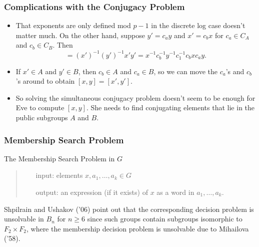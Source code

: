 \documentclass{beamer}
\begin{document}
\begin{frame}
	\frametitle{Complications with the Conjugacy Problem}
	\begin{itemize}
		\item That exponents are only defined mod $p-1$ in the discrete log case doesn't matter much. On the other hand, suppose $y' = c_ay$ and $x' = c_bx$ for $c_a\in C_A$ and $c_b\in C_B$. Then\pause
		\begin{equation*}
			[x',y'] = (x')^{-1}(y')^{-1}x'y' = x^{-1}c_b^{-1}y^{-1}c_1^{-1}c_bxc_ay.
		\end{equation*}\pause
		\item If $x'\in A$ and $y'\in B$, then $c_b\in A$ and $c_a\in B$, so we can move the $c_a$'s and $c_b$'s around to obtain $[x,y] = [x', y']$.\pause
		\item So solving the simultaneous conjugacy problem doesn't seem to be enough for Eve to compute $[x,y]$. She needs to find conjugating elements that lie in the public subgroups $A$ and $B$.
	\end{itemize}
\end{frame}

\begin{frame}
	\frametitle{Membership Search Problem}
	\begin{block}{The Membership Search Problem in $G$}
		\begin{quote}
			\begin{itemize}
				\item[input: ]elements $x, a_1, \ldots, a_k\in G$
				\item[output: ]an expression (if it exists) of $x$ as a word in $a_1, \ldots, a_k$.
			\end{itemize}
		\end{quote}
	\end{block}\pause
	Shpilrain and Ushakov ('06) point out that the corresponding decision problem is unsolvable in $B_n$ for $n\geq 6$ since such groups contain subgroups isomorphic to $F_2\times F_2$, where the membership decision problem is unsolvable due to Mihailova ('58).
\end{frame}
\end{document}
